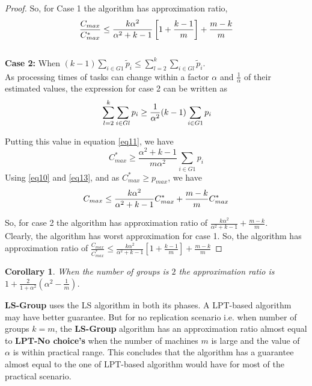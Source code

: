 \documentclass[10pt, conference, compsocconf]{IEEEtran}
\newtheorem{corollary}{Corollary}[theorem]
\begin{document}
\begin{proof}
  So, for Case 1 the algorithm has approximation ratio,
  \begin{equation}{\nonumber}
    \frac{C_{max}}{C_{max}^{*}} \leq \frac{k\alpha^{2}}{\alpha^{2}+k-1}\left[1+ {\frac{k-1}{m}} \right]+ {\frac{m-k}{m}} \end{equation}\\
  
  \textbf{Case 2:} When $(k-1)\sum_{i \in G1 }^{}{\tilde p_{i}} \leq \sum_{l=2}^{k}\sum_{i \in Gl }^{}{\tilde p_{i}}$. \\
  
  As processing times of tasks  can change within a factor $\alpha$ and $\frac{1}{\alpha}$ of their estimated values, the expression for case 2 can be written as 
  \begin{equation}{\nonumber}
    \sum_{l=2}^{k}\sum_{i \in Gl }^{}{ p_{i}} \geq \frac{1}{\alpha^2} (k-1)\sum_{i \in G1 }^{}{ p_{i}}
  \end{equation}
  
  Putting this value in equation \ref{eq11}, we have
  \begin{equation}\label{eq13}
    C_{max}^{*} \geq \frac{\alpha^2+k-1}{m\alpha^2}\sum_{i \in G1 }^{}{ p_{i}}
  \end{equation}
  Using \ref{eq10} and \ref{eq13}, and as $C_{max}^{*} \geq p_{max}$, we have
  \begin{equation}{\nonumber}
    C_{max} \leq \frac{k\alpha^2}{\alpha^2+k-1}C_{max}^{*}+\frac{m-k}{m}C_{max}^{*}
  \end{equation}
  
  So, for case 2 the algorithm has approximation ratio of $\frac{k\alpha^2}{\alpha^2+k-1}+\frac{m-k}{m}$.\\
  Clearly, the algorithm has worst approximation for case 1.  So, the
  algorithm has approximation ratio of $\frac{C_{max}}{C_{max}^{*}}
  \leq \frac{k\alpha^{2}}{\alpha^{2}+k-1}\left[1+ {\frac{k-1}{m}}
  \right]+ {\frac{m-k}{m}}$
\end{proof}

\begin{corollary}
  When the number of groups is $2$ the approximation ratio is $ 1+
  \frac{2}{1+\alpha^{2}} (\alpha^2-\frac{1}{m})$.
\end{corollary}

\textbf{LS-Group} uses the LS algorithm in both its phases. A
LPT-based algorithm may have better guarantee. But for no replication
scenario i.e. when number of groups $k=m$, the \textbf{LS-Group}
algorithm has an approximation ratio almost equal to \textbf{LPT-No
  choice's} when the number of machines $m$ is large and the value of
$\alpha$ is within practical range. This concludes that the algorithm
has a guarantee almost equal to the one of LPT-based algorithm would
have for most of the practical scenario.
\end{document}
